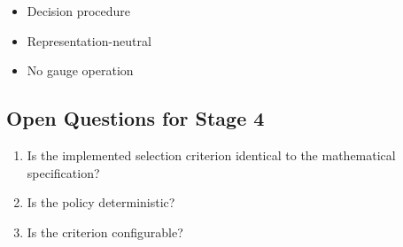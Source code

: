 \begin{itemize}
\item Decision procedure
\item Representation-neutral
\item No gauge operation
\end{itemize}

\subsection{Open Questions for Stage 4}

\begin{enumerate}
\item Is the implemented selection criterion identical to the mathematical specification?
\item Is the policy deterministic?
\item Is the criterion configurable?
\end{enumerate}
